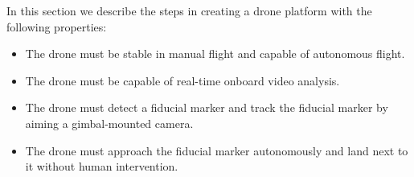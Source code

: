 In this section we describe the steps in creating a drone platform with the following properties:

\begin{itemize}
    \item The drone must be stable in manual flight and capable of autonomous flight.
    \item The drone must be capable of real-time onboard video analysis.
    \item The drone must detect a fiducial marker and track the fiducial marker by aiming a gimbal-mounted camera.
    \item The drone must approach the fiducial marker autonomously and land next to it without human intervention.
\end{itemize}